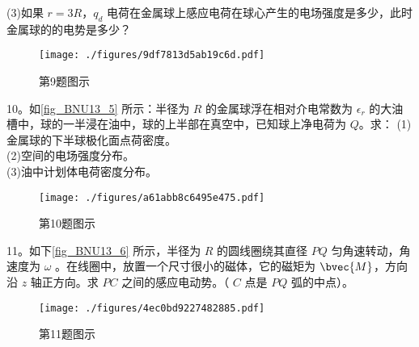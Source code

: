 (3)如果 $r=3R$，$q_d$ 电荷在金属球上感应电荷在球心产生的电场强度是多少，此时金属球的的电势是多少？
\begin{figure}[ht]
\centering
\texttt{[image: ./figures/9df7813d5ab19c6d.pdf]}
\caption{第9题图示} \label{fig_BNU13_4}
\end{figure}
10。如\autoref{fig_BNU13_5} 所示：半径为 $R$ 的金属球浮在相对介电常数为 $\epsilon_r$ 的大油槽中，球的一半浸在油中，球的上半部在真空中，已知球上净电荷为 $Q$。求：
(1)金属球的下半球极化面点荷密度。\\
(2)空间的电场强度分布。\\
(3)油中计划体电荷密度分布。
\begin{figure}[ht]
\centering
\texttt{[image: ./figures/a61abb8c6495e475.pdf]}
\caption{第10题图示} \label{fig_BNU13_5}
\end{figure}
11。如下\autoref{fig_BNU13_6} 所示，半径为 $R$ 的圆线圈绕其直径 $PQ$ 匀角速转动，角速度为 $\omega$ 。在线圈中，放置一个尺寸很小的磁体，它的磁矩为 $
\bvec{M}$，方向沿 $z$ 轴正方向。求 $PC$ 之间的感应电动势。（ $C$ 点是 $PQ$ 弧的中点）。
\begin{figure}[ht]
\centering
\texttt{[image: ./figures/4ec0bd9227482885.pdf]}
\caption{第11题图示} \label{fig_BNU13_6}
\end{figure}